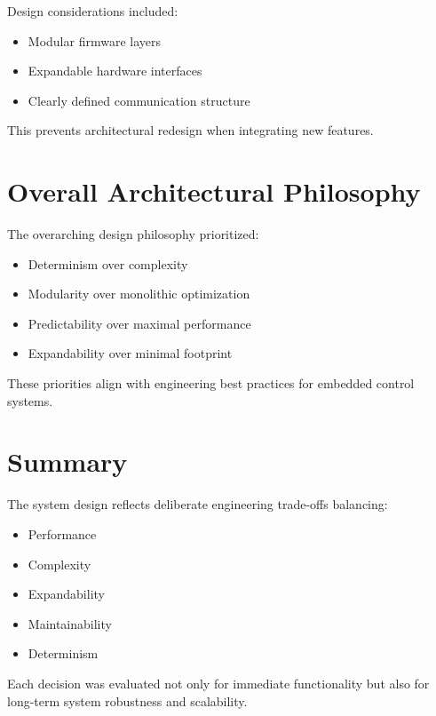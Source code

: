 Design considerations included:

\begin{itemize}
	\item Modular firmware layers
	\item Expandable hardware interfaces
	\item Clearly defined communication structure
\end{itemize}

This prevents architectural redesign when integrating new features.


\section{Overall Architectural Philosophy}

The overarching design philosophy prioritized:

\begin{itemize}
	\item Determinism over complexity
	\item Modularity over monolithic optimization
	\item Predictability over maximal performance
	\item Expandability over minimal footprint
\end{itemize}

These priorities align with engineering best practices for embedded control systems.


\section{Summary}

The system design reflects deliberate engineering trade-offs balancing:

\begin{itemize}
	\item Performance
	\item Complexity
	\item Expandability
	\item Maintainability
	\item Determinism
\end{itemize}

Each decision was evaluated not only for immediate functionality but also for long-term system robustness and scalability.